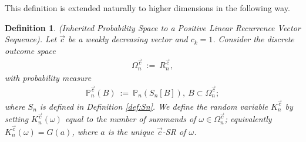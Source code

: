 \documentclass[]{interact}
\theoremstyle{plain}
\numberwithin{equation}{section} %
\newtheorem{definition}[thm]{Definition}
\numberwithin{table}{section} %
\numberwithin{figure}{section}
\begin{document}
This definition is extended naturally to higher dimensions in the following way.
\begin{definition}(Inherited Probability Space to a Positive Linear Recurrence Vector Sequence). Let $\vec{c}$ be a weakly decreasing vector and $c_k = 1$. Consider the discrete outcome space 
\begin{align*}
    \Omega_n^{\vec{c}} \ := \ R_n^{\vec{c}} ,
\end{align*}
with probability measure
\begin{align*}
    \mathbb{P}_n^{\vec{c}}(B) \ :=\ \mathbb{P}_n(S_n[B]) ,\ B \subset \Omega_n^{ \vec{c} };
\end{align*}
 where $S_n$ is defined in Definition \textcolor{blue}{\ref{def:Sn}}. We define the random variable $K_n^{\vec{c}}$ by setting $K_n^{\vec{c}}(\omega)$ equal to the number of summands of $\omega \in \Omega_n^{\vec{c}}$; equivalently $K_n^{\vec{c}}(\omega) = G(a)$, where $a$ is the unique $\vec{c}$-SR of $\omega$.
\end{definition}
\end{document}
